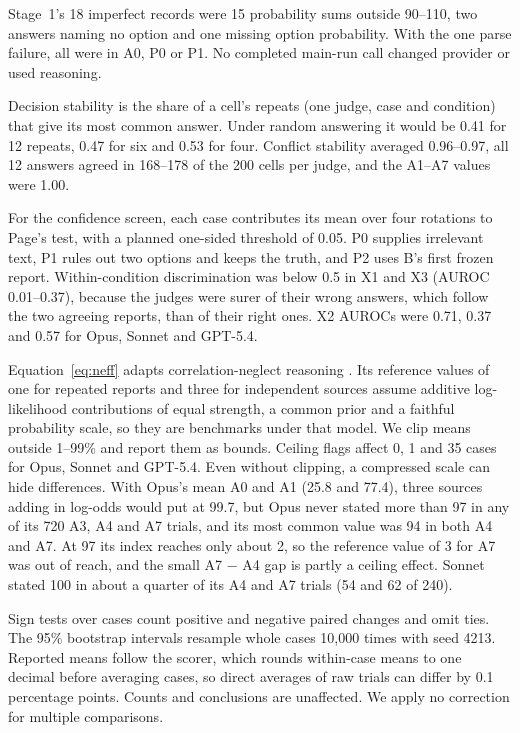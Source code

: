 Stage~1's 18 imperfect records were 15 probability sums outside 90--110, two answers naming
no option and one missing option probability. With the one parse failure, all were in A0, P0
or P1. No completed main-run call changed provider or used reasoning.

Decision stability is the share of a cell's repeats (one judge, case and condition) that give
its most common answer. Under random answering it would be 0.41 for 12 repeats, 0.47 for six
and 0.53 for four. Conflict stability averaged 0.96--0.97, all 12 answers agreed in 168--178
of the 200 cells per judge, and the A1--A7 values were 1.00.

For the confidence screen, each case contributes its mean over four rotations to Page's test,
with a planned one-sided threshold of 0.05. P0 supplies irrelevant text, P1 rules out two
options and keeps the truth, and P2 uses B's first frozen report. Within-condition
discrimination was below 0.5 in X1 and X3 (AUROC 0.01--0.37), because the judges were surer of
their wrong answers, which follow the two agreeing reports, than of their right ones. X2
AUROCs were 0.71, 0.37 and 0.57 for Opus, Sonnet and GPT-5.4.

Equation~\eqref{eq:neff} adapts correlation-neglect reasoning
\citep{demarzo2003persuasion,enke2019correlation}. Its reference values of one for repeated
reports and three for independent sources assume additive log-likelihood contributions of
equal strength, a common prior and a faithful probability scale, so they are benchmarks under
that model. We clip means outside 1--99\% and report them as bounds. Ceiling flags affect 0, 1
and 35 cases for Opus, Sonnet and GPT-5.4. Even without clipping, a compressed scale can hide
differences. With Opus's mean A0 and A1 (25.8 and 77.4), three sources adding in log-odds would
put \pt{} at 99.7, but Opus never stated more than 97 in any of its 720 A3, A4 and A7 trials,
and its most common value was 94 in both A4 and A7. At 97 its index reaches only about 2, so
the reference value of 3 for A7 was out of reach, and the small A7 $-$ A4 gap is partly a
ceiling effect. Sonnet stated 100 in about a quarter of its A4 and A7 trials (54 and 62 of 240).

Sign tests over cases count positive and negative paired changes and omit ties. The 95\%
bootstrap intervals resample whole cases 10,000 times with seed 4213. Reported means follow the
scorer, which rounds within-case means to one decimal before averaging cases, so direct averages
of raw trials can differ by 0.1 percentage points. Counts and conclusions are unaffected. We apply
no correction for multiple comparisons.

